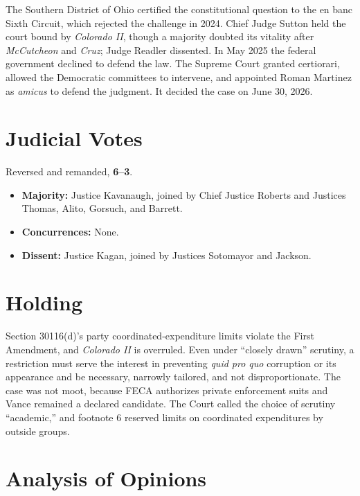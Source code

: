 \documentclass[12pt]{article}
\begin{document}
The Southern District of Ohio certified the constitutional question to the en banc Sixth Circuit, which rejected the challenge in 2024. Chief Judge Sutton held the court bound by \textit{Colorado II}, though a majority doubted its vitality after \textit{McCutcheon} and \textit{Cruz}; Judge Readler dissented. In May 2025 the federal government declined to defend the law. The Supreme Court granted certiorari, allowed the Democratic committees to intervene, and appointed Roman Martinez as \textit{amicus} to defend the judgment. It decided the case on June 30, 2026.

\section{Judicial Votes}

Reversed and remanded, \textbf{6--3}.
\begin{itemize}
\item \textbf{Majority:} Justice Kavanaugh, joined by Chief Justice Roberts and Justices Thomas, Alito, Gorsuch, and Barrett.
\item \textbf{Concurrences:} None.
\item \textbf{Dissent:} Justice Kagan, joined by Justices Sotomayor and Jackson.
\end{itemize}

\section{Holding}

Section 30116(d)'s party coordinated-expenditure limits violate the First Amendment, and \textit{Colorado II} is overruled. Even under ``closely drawn'' scrutiny, a restriction must serve the interest in preventing \textit{quid pro quo} corruption or its appearance and be necessary, narrowly tailored, and not disproportionate. The case was not moot, because FECA authorizes private enforcement suits and Vance remained a declared candidate. The Court called the choice of scrutiny ``academic,'' and footnote 6 reserved limits on coordinated expenditures by outside groups.

\section{Analysis of Opinions}
\end{document}
